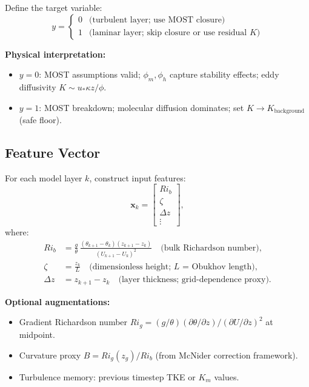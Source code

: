 \documentclass[11pt]{article}
\begin{document}
Define the target variable:
\begin{equation}
y = 
\begin{cases}
0 & \text{(turbulent layer; use MOST closure)} \\
1 & \text{(laminar layer; skip closure or use residual $K$)}
\end{cases}
\label{eq:binary_target}
\end{equation}

\textbf{Physical interpretation:}
\begin{itemize}[leftmargin=*]
\item $y=0$: MOST assumptions valid; $\phi_m, \phi_h$ capture stability effects; eddy diffusivity $K \sim u_* \kappa z / \phi$.
\item $y=1$: MOST breakdown; molecular diffusion dominates; set $K \to K_{\text{background}}$ (safe floor).
\end{itemize}

\subsection{Feature Vector}

For each model layer $k$, construct input features:
\begin{equation}
\mathbf{x}_k = 
\begin{bmatrix}
Ri_b \\
\zeta \\
\Delta z \\
\vdots
\end{bmatrix},
\label{eq:feature_vector}
\end{equation}
where:
\begin{align}
Ri_b &= \frac{g}{\theta}\,\frac{(\theta_{k+1}-\theta_k)(z_{k+1}-z_k)}{(U_{k+1}-U_k)^2} \quad \text{(bulk Richardson number)}, \label{eq:Ri_b} \\
\zeta &= \frac{z_k}{L} \quad \text{(dimensionless height; $L$ = Obukhov length)}, \label{eq:zeta} \\
\Delta z &= z_{k+1} - z_k \quad \text{(layer thickness; grid-dependence proxy)}. \label{eq:Delta_z}
\end{align}

\textbf{Optional augmentations:}
\begin{itemize}[leftmargin=*]
\item Gradient Richardson number $Ri_g = (g/\theta)(\partial\theta/\partial z)/(\partial U/\partial z)^2$ at midpoint.
\item Curvature proxy $B = Ri_g(z_g)/Ri_b$ (from McNider correction framework).
\item Turbulence memory: previous timestep TKE or $K_m$ values.
\end{itemize}
\end{document}
